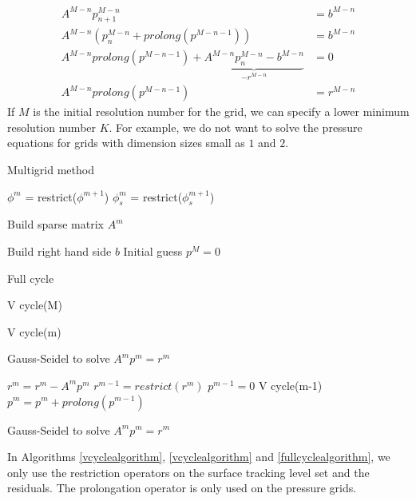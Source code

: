 \begin{equation}
\begin{split}
A^{M-n} p^{M-n}_{n+1} &= b^{M-n} \\
A^{M-n} (p^{M-n}_n + prolong(p^{M-n-1})) &= b^{M-n} \\
A^{M-n} prolong(p^{M-n-1}) +  \underbrace{ A^{M-n} p^{M-n}_n -  b^{M-n} }_\text{$-r^{M-n}$} &= 0 \\
A^{M-n} prolong(p^{M-n-1})  &= r^{M-n}
\end{split}
\label{multigridsplit}
\end{equation}
\noindent
If $M$ is the initial resolution number for the grid, we can specify a lower minimum resolution number $K$. For example, we do not want to solve the pressure equations for grids with dimension sizes small as $1$ and $2$.

\begin{algorithm}
\caption{Multigrid method}
\begin{algorithmic}[1]
\STATE $\phi^m$ = restrict($\phi^{m+1}$)
\STATE $\phi^m_s$ = restrict($\phi^{m+1}_s$)
\ENDFOR

\STATE Build sparse matrix $A^m$
\ENDFOR

\STATE Build right hand side $b$
\STATE Initial guess $p^M = 0$

\STATE Full cycle
\ENDFOR

\STATE V cycle(M)
\ENDFOR

\end{algorithmic}
\label{multigridalgorithm}
\end{algorithm}


\begin{algorithm}
\caption{V cycle(m)}
\begin{algorithmic}[1]

\STATE Gauss-Seidel to solve $A^mp^m = r^m$
\ENDFOR

\STATE $r^m = r^m - A^mp^m$
\STATE $r^{m-1} = restrict(r^m)$
\STATE $p^{m-1} = 0$
\STATE V cycle(m-1)
\STATE $p^m = p^m + prolong(p^{m-1})$

\STATE Gauss-Seidel to solve $A^mp^m = r^m$
\ENDFOR

\end{algorithmic}
\label{multigridalgorithm}
\end{algorithm}
\noindent
In Algorithms \ref{vcyclealgorithm}, \ref{vcyclealgorithm} and \ref{fullcyclealgorithm}, we only use the restriction operators on the surface tracking level set and the residuals. The prolongation operator is only used on the pressure grids. 

